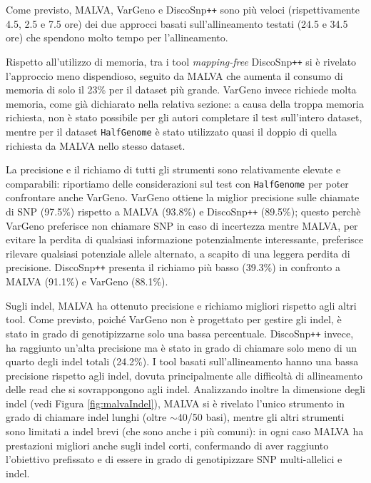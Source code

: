 \documentclass[../main.tex]{subfiles}
\begin{document}
\noindent
Come previsto, MALVA, VarGeno e DiscoSnp\texttt{++} sono più veloci (rispettivamente 4.5, 2.5 e 7.5 ore) dei due approcci basati sull'allineamento testati (24.5 e 34.5 ore) che spendono molto tempo per l'allineamento.

Rispetto all'utilizzo di memoria, tra i tool \textit{mapping-free} DiscoSnp\texttt{++} si è rivelato l'approccio meno dispendioso, seguito da MALVA che aumenta il consumo di memoria di solo il 23\% per il dataset più grande. VarGeno invece richiede molta memoria, come già dichiarato nella relativa sezione: a causa della troppa memoria richiesta, non è stato possibile per gli autori completare il test sull'intero dataset, mentre per il dataset \texttt{HalfGenome} è stato utilizzato quasi il doppio di quella richiesta da MALVA nello stesso dataset.


La precisione e il richiamo di tutti gli strumenti sono relativamente elevate e comparabili: riportiamo delle considerazioni sul test con \texttt{HalfGenome} per poter confrontare anche VarGeno. VarGeno ottiene la miglior precisione sulle chiamate di SNP (97.5\%) rispetto a MALVA (93.8\%) e DiscoSnp\texttt{++} (89.5\%); questo perchè VarGeno preferisce non chiamare SNP in caso di incertezza mentre MALVA, per evitare la perdita di qualsiasi informazione potenzialmente interessante, preferisce rilevare qualsiasi potenziale allele alternato, a scapito di una leggera perdita di precisione. DiscoSnp\texttt{++} presenta il richiamo più basso (39.3\%) in confronto a MALVA (91.1\%) e VarGeno (88.1\%).


Sugli indel, MALVA ha ottenuto precisione e richiamo migliori rispetto agli altri tool. Come previsto, poiché VarGeno non è progettato per gestire gli indel, è stato in grado di genotipizzarne solo una bassa percentuale. DiscoSnp\texttt{++} invece, ha raggiunto un'alta precisione ma è stato in grado di chiamare solo meno di un quarto degli indel totali (24.2\%). I tool basati sull'allineamento hanno una bassa precisione rispetto agli indel, dovuta principalmente alle difficoltà di allineamento delle read che si sovrappongono agli indel. Analizzando inoltre la dimensione degli indel (vedi Figura \ref{fig:malvaIndel}), MALVA si è rivelato l'unico strumento in grado di chiamare indel lunghi (oltre $\sim$40/50 basi), mentre gli altri strumenti sono limitati a indel brevi (che sono anche i più comuni): in ogni caso MALVA ha prestazioni migliori anche sugli indel corti, confermando di aver raggiunto l'obiettivo prefissato e di essere in grado di genotipizzare SNP multi-allelici e indel.\\
\end{document}
